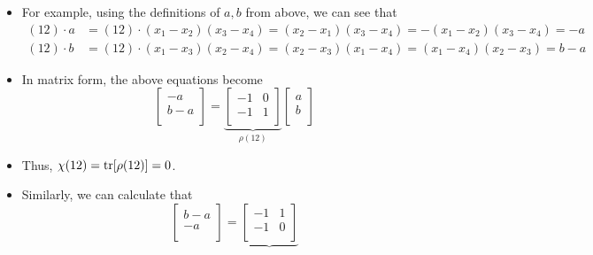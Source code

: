 \documentclass[../notes.tex]{subfiles}
\begin{document}
\begin{itemize}
\begin{itemize}
\begin{itemize}
            \item For example, using the definitions of $a,b$ from above, we can see that
            \begin{align*}
                (12)\cdot a &= (12)\cdot(x_1-x_2)(x_3-x_4)
                    = (x_2-x_1)(x_3-x_4)
                    = -(x_1-x_2)(x_3-x_4)
                    = -a\\
                (12)\cdot b &= (12)\cdot(x_1-x_3)(x_2-x_4)
                    = (x_2-x_3)(x_1-x_4)
                    = (x_1-x_4)(x_2-x_3)
                    = b-a
            \end{align*}
            \item In matrix form, the above equations become
            \begin{equation*}
                \begin{bmatrix}
                    -a\\
                    b-a\\
                \end{bmatrix}
                = \underbrace{
                    \begin{bmatrix}
                        -1 & 0\\
                        -1 & 1\\
                    \end{bmatrix}
                }_{\rho(12)}
                \begin{bmatrix}
                    a\\
                    b\\
                \end{bmatrix}
            \end{equation*}
            \item Thus, $\chi(12)=\tr[\rho(12)]=0$.
            \item Similarly, we can calculate that
            \begin{equation*}
                \begin{bmatrix}
                    b-a\\
                    -a\\
                \end{bmatrix}
                = \underbrace{
                    \begin{bmatrix}
                        -1 & 1\\
                        -1 & 0\\
                    \end{bmatrix}
}
\end{equation*}
\end{itemize}
\end{itemize}
\end{itemize}
\end{document}
